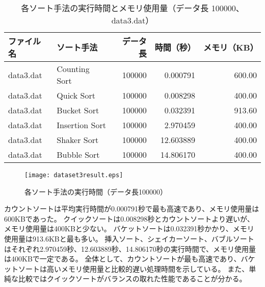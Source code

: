 \documentclass[a4j, 11pt]{jarticle}
\begin{document}
\begin{table}[H]
  \centering
  \caption{各ソート手法の実行時間とメモリ使用量（データ長 100000、data3.dat）}\label{dataset3allresult}
  \begin{tabular}{|l|l|r|r|r|}
    \hline
    \textbf{ファイル名} & \textbf{ソート手法} & \textbf{データ長} & \textbf{時間（秒）} & \textbf{メモリ（KB）} \\
    \hline
    data3.dat & Counting Sort  & 100000 & 0.000791  & 600.00 \\
    data3.dat & Quick Sort     & 100000 & 0.008298  & 400.00 \\
    data3.dat & Bucket Sort    & 100000 & 0.032391  & 913.60 \\
    data3.dat & Insertion Sort & 100000 & 2.970459  & 400.00 \\
    data3.dat & Shaker Sort    & 100000 & 12.603889 & 400.00 \\
    data3.dat & Bubble Sort    & 100000 & 14.806170 & 400.00 \\
    \hline
  \end{tabular}
\end{table}
\begin{figure}[H]
  \centering
  \texttt{[image: dataset3result.eps]}
  \caption{各ソート手法の実行時間（データ長100000）}\label{dataset3allresultgraph}
\end{figure}
カウントソートは平均実行時間が0.000791秒で最も高速であり、メモリ使用量は600KBであった。
クイックソートは0.008298秒とカウントソートより遅いが、メモリ使用量は400KBと少ない。
バケットソートは0.032391秒かかり、メモリ使用量は913.6KBと最も多い。
挿入ソート、シェイカーソート、バブルソートはそれぞれ2.970459秒、12.603889秒、14.806170秒の実行時間で、メモリ使用量は400KBで一定である。
全体として、カウントソートが最も高速であり、バケットソートは高いメモリ使用量と比較的遅い処理時間を示している。
また、単純な比較ではクイックソートがバランスの取れた性能であることが分かる。
\newpage
\end{document}
